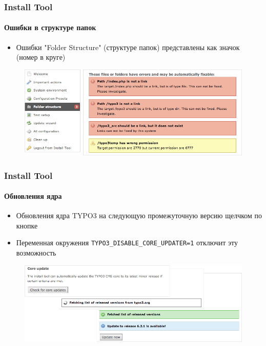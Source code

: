 
\begin{frame}[fragile]
	\frametitle{Install Tool}
	\framesubtitle{Ошибки в структуре папок}

	\begin{itemize}
		\item Ошибки  "Folder Structure" (структуре папок) представлены как значок (номер в круге)
	\end{itemize}

	\begin{figure}
		\includegraphics[width=0.95\linewidth]{Images/InstallTool/ErrorsInFolderStructure.png}
	\end{figure}

\end{frame}


\begin{frame}[fragile]
	\frametitle{Install Tool}
	\framesubtitle{Обновления ядра}

	\begin{itemize}
		\item Обновления ядра TYPO3 на следующую промежуточную версию щелчком по кнопке
		\item Переменная окружения \texttt{TYPO3\_DISABLE\_CORE\_UPDATER=1} отключит эту возможность
	\end{itemize}

	\begin{figure}
		\includegraphics[width=0.95\linewidth]{Images/InstallTool/CoreUpdate.png}
	\end{figure}

\end{frame}

